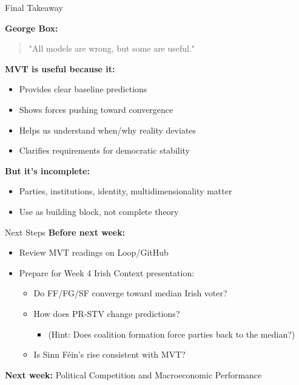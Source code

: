 \documentclass[10pt]{beamer}
\begin{document}
\begin{frame}{Final Takeaway}
\begin{center}
\Large \textbf{George Box:}


\begin{quote}
"All models are wrong, but some are useful."
\end{quote}
\end{center}




\textbf{MVT is useful because it:}
\begin{itemize}
\item Provides clear baseline predictions
\item Shows forces pushing toward convergence
\item Helps us understand when/why reality deviates
\item Clarifies requirements for democratic stability
\end{itemize}




\textbf{But it's incomplete:}
\begin{itemize}
\item Parties, institutions, identity, multidimensionality matter
\item Use as building block, not complete theory
\end{itemize}
\end{frame}

\begin{frame}{Next Steps}
\textbf{Before next week:}
\begin{itemize}
\item Review MVT readings on Loop/GitHub
\item Prepare for Week 4 Irish Context presentation:
\begin{itemize}
\item Do FF/FG/SF converge toward median Irish voter?
\item How does PR-STV change predictions?
\begin{itemize}
\item (Hint: Does coalition formation force parties back to the median?)
\end{itemize}
\item Is Sinn Féin's rise consistent with MVT?
\end{itemize}
\end{itemize}

\textbf{Next week:} Political Competition and Macroeconomic Performance
\end{frame}
\end{document}
